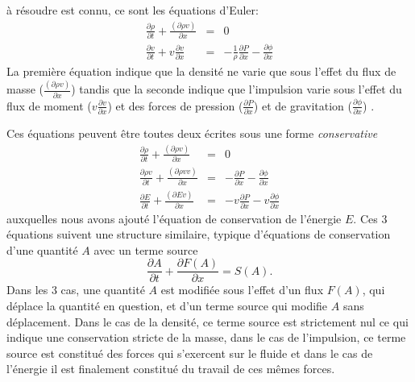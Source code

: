  à résoudre est connu, ce sont les équations d'Euler:
\begin{eqnarray}
\frac{\partial \rho}{\partial t}+\frac{(\partial \rho v)}{\partial x}&=&0\\
\frac{\partial v}{\partial t} + v \frac{\partial v}{\partial x}&=&-\frac{1}{\rho}\frac{\partial P}{\partial x}-\frac{\partial \phi}{\partial x}
\end{eqnarray}
La première équation indique que la densité ne varie que sous l'effet du flux de masse ($\frac{(\partial \rho v)}{\partial x}$) tandis que la seconde indique que l'impulsion varie sous l'effet du flux de moment ($ v \frac{\partial v}{\partial x}$) et des forces de pression ($\frac{\partial P}{\partial x}$)  et de gravitation ($\frac{\partial \phi}{\partial x}$) .

Ces équations peuvent être toutes deux écrites sous une forme \textit{conservative}
\begin{eqnarray}
\frac{\partial \rho}{\partial t}+\frac{(\partial \rho v)}{\partial x}&=&0\\
\frac{\partial \rho v}{\partial t}+\frac{(\partial \rho v v)}{\partial x}&=&-\frac{\partial P}{\partial x}-\frac{\partial \phi}{\partial x}\\
\frac{\partial E}{\partial t}+\frac{(\partial E v)}{\partial x}&=&-v \frac{\partial P}{\partial x}-v\frac{\partial \phi}{\partial x}
\end{eqnarray}
auxquelles nous avons ajouté l'équation de conservation de l'énergie $E$. Ces 3 équations suivent une structure similaire, typique d'équations de conservation d'une quantité $A$ avec un terme source
\begin{equation}
\frac{\partial A}{\partial t}+\frac{\partial F(A)}{\partial x}=S(A).
\label{e:cons}
\end{equation}
Dans les 3 cas, une quantité $A$ est modifiée sous l'effet d'un flux $F(A)$, qui déplace la quantité en question, et d'un terme source qui modifie $A$ sans déplacement. Dans le cas de la densité, ce terme source est strictement nul ce qui indique une conservation stricte de la masse, dans le cas de l'impulsion, ce terme source est constitué des forces qui s'exercent sur le fluide et dans le cas de l'énergie il est finalement constitué du travail de ces mêmes forces.

